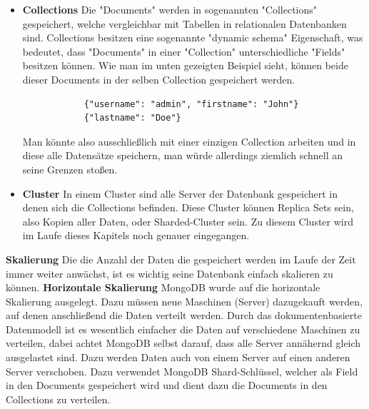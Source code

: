 \begin{itemize}
\begin{figure}[h!]
        \end{figure}
        \cite{mongodb_json_vs_bson}
    \item \textbf{Collections}
        \newline
        Die "Documents" werden in sogenannten "Collections" gespeichert, welche vergleichbar mit Tabellen in relationalen Datenbanken sind. Collections besitzen eine sogenannte "dynamic schema" Eigenschaft, was bedeutet, dass "Documents" in einer "Collection" unterschiedliche "Fields" besitzen können. Wie man im unten gezeigten Beispiel sieht, können beide dieser Documents in der selben Collection gespeichert werden.
        \begin{lstlisting}
            {"username": "admin", "firstname": "John"}
            {"lastname": "Doe"}
        \end{lstlisting}
        Man könnte also ausschließlich mit einer einzigen Collection arbeiten und in diese alle Datensätze speichern, man würde allerdings ziemlich schnell an seine Grenzen stoßen.
    \item \textbf{Cluster}
        \newline
        In einem Cluster sind alle Server der Datenbank gespeichert in denen sich die Collections befinden. Diese Cluster können Replica Sets sein, also Kopien aller Daten, oder Sharded-Cluster sein. Zu diesem Cluster wird im Laufe dieses Kapitels noch genauer eingegangen.
        \cite{mongodb_collections}
\end{itemize}

\textbf{Skalierung}
\newline
Die die Anzahl der Daten die gespeichert werden im Laufe der Zeit immer weiter anwächst, ist es wichtig seine Datenbank einfach skalieren zu können. 
\newline
\textbf{Horizontale Skalierung}
\newline
MongoDB wurde auf die horizontale Skalierung ausgelegt. Dazu müssen neue Maschinen (Server) dazugekauft werden, auf denen anschließend die Daten verteilt werden. Durch das dokumentenbasierte Datenmodell ist es wesentlich einfacher die Daten auf verschiedene Maschinen zu verteilen, dabei achtet MongoDB selbst darauf, dass alle Server annähernd gleich ausgelastet sind. Dazu werden Daten auch von einem Server auf einen anderen Server verschoben. Dazu verwendet MongoDB Shard-Schlüssel, welcher als Field in den Documents gespeichert wird und dient dazu die Documents in den Collections zu verteilen.
\cite{mongodb_collections}

